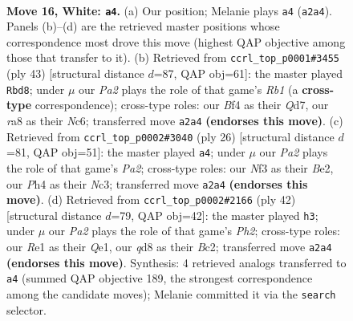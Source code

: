 \documentclass[11pt]{article}
\begin{document}
\clearpage

\begin{figure}[p]\centering
\begin{subfigure}{0.46\textwidth}\centering
\resizebox{\linewidth}{!}{%
\newchessgame
\chessboard[
  setfen={r1bqk1r1/5p2/1p2pnp1/p1b4p/5B1P/1P1B1NP1/P1P1QP2/R3R1K1 w q - 6 16},
  showmover=false,
  pgfstyle=straightmove, color=movearrow, markmove={a2-a4}
]}
\caption{}
\end{subfigure}\hfill
\begin{subfigure}{0.46\textwidth}\centering
\resizebox{\linewidth}{!}{%
\newchessgame
\chessboard[
  setfen={1r2r1k1/3q1pp1/p1n1bb1p/1pBp4/8/P1PB1N1P/1P2RPP1/R2Q2K1 b - - 4 22},
  showmover=false,
  pgfstyle=straightmove, color=movearrow, markmove={b8-d8}
]}
\caption{}
\end{subfigure}
\\[4pt]
\begin{subfigure}{0.46\textwidth}\centering
\resizebox{\linewidth}{!}{%
\newchessgame
\chessboard[
  setfen={r1bq1rk1/p3ppb1/1p1p1np1/7p/2P5/2N1BPP1/PP1QBP1P/R2R2K1 w - - 0 14},
  showmover=false,
  pgfstyle=straightmove, color=movearrow, markmove={a2-a4}
]}
\caption{}
\end{subfigure}\hfill
\begin{subfigure}{0.46\textwidth}\centering
\resizebox{\linewidth}{!}{%
\newchessgame
\chessboard[
  setfen={2r1k2r/1pqbbp1p/p3p1p1/n2pP3/5P2/2P1BN2/PPB2RPP/1R2Q1K1 w k - 12 22},
  showmover=false,
  pgfstyle=straightmove, color=movearrow, markmove={h2-h3}
]}
\caption{}
\end{subfigure}
\caption{\textbf{Move 16, White: \texttt{a4}.} (a) Our position; Melanie plays \texttt{a4} (\texttt{a2a4}). Panels (b)--(d) are the retrieved master positions whose correspondence most drove this move (highest QAP objective among those that transfer to it). (b) Retrieved from \texttt{ccrl\_top\_p0001\#3455} (ply 43) [structural distance $d$=87, QAP obj=61]: the master played \texttt{Rbd8}; under $\mu$ our \emph{Pa2} plays the role of that game's \emph{Rb1} (a \textbf{cross-type} correspondence); cross-type roles: our \emph{B}f4 as their \emph{Q}d7, our \emph{r}a8 as their \emph{N}c6; transferred move \texttt{a2a4} \textbf{(endorses this move)}. (c) Retrieved from \texttt{ccrl\_top\_p0002\#3040} (ply 26) [structural distance $d$=81, QAP obj=51]: the master played \texttt{a4}; under $\mu$ our \emph{Pa2} plays the role of that game's \emph{Pa2}; cross-type roles: our \emph{N}f3 as their \emph{B}e2, our \emph{P}h4 as their \emph{N}c3; transferred move \texttt{a2a4} \textbf{(endorses this move)}. (d) Retrieved from \texttt{ccrl\_top\_p0002\#2166} (ply 42) [structural distance $d$=79, QAP obj=42]: the master played \texttt{h3}; under $\mu$ our \emph{Pa2} plays the role of that game's \emph{Ph2}; cross-type roles: our \emph{R}e1 as their \emph{Q}e1, our \emph{q}d8 as their \emph{B}c2; transferred move \texttt{a2a4} \textbf{(endorses this move)}. Synthesis: 4 retrieved analogs transferred to \texttt{a4} (summed QAP objective 189, the strongest correspondence among the candidate moves); Melanie committed it via the \texttt{search} selector.}
\label{fig:thought-m30}
\end{figure}
\end{document}
